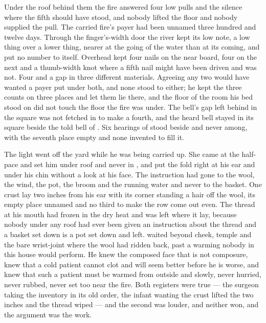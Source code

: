 \scenebreak

Under the roof behind them the fire answered four low pulls and the silence where the fifth should have stood, and nobody lifted the floor and nobody supplied the pull. The carried fire's payer had been unnamed three hundred and twelve days. Through the finger's-width door the river kept its low note, a low thing over a lower thing, nearer at the going of the water than at its coming, and put no number to itself. Overhead  kept four nails on the near board, four on the next and a thumb-width knot where a fifth nail might have been driven and was not. Four and a gap in three different materials. Agreeing any two would have wanted a payer put under both, and none stood to either; he kept the three counts on three places and let them lie there, and the floor of the room his bed stood on did not touch the floor the fire was under. The bell's gap left behind in the square was not fetched in to make a fourth, and the heard bell stayed in its square beside the told bell of . Six hearings of  stood beside and never among, with the seventh place empty and none invented to fill it.

The light went off the yard while he was being carried up. She came at the half-pace and set him under  roof and never in , and put the fold right at his ear and under his chin without a look at his face. The instruction had gone to the wool, the wind, the pot, the broom and the running water and never to the basket. One crust lay two inches from his ear with its corner standing a hair off the wool, its empty place unnamed and no third to make the row come out even. The thread at his mouth had frozen in the dry heat and was left where it lay, because nobody under any roof had ever been given an instruction about the thread and a basket set down is a pot set down and left.  waited beyond cheek, temple and the bare wrist-joint where the wool had ridden back, past a warming nobody in this house would perform. He knew the composed face that is not composure, knew that a cold patient cannot clot and will seem better before he is worse, and knew that such a patient must be warmed from outside and slowly, never hurried, never rubbed, never set too near the fire. Both registers were true --- the surgeon taking the inventory in its old order, the infant wanting the crust lifted the two inches and the thread wiped --- and the second was louder, and neither won, and the argument was the work.


